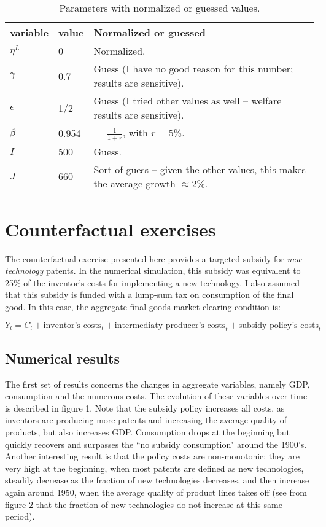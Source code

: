 \documentclass[a4paper,11pt]{article}
\begin{document}
\begin{table}[h!]
\caption{Parameters with normalized or guessed values.}
\centering
\begin{tabular}{lll}
\hline \hline
variable & value & Normalized or guessed \\ \hline
$\eta^L$ & 0 & Normalized. \\
$\gamma$ & 0.7 & Guess (I have no good reason for this number; results are sensitive). \\
$\epsilon$ & 1/2 & Guess (I tried other values as well -- welfare results are sensitive). \\
$\beta$ & 0.954 & $=\frac{1}{1+r}$, with $r = 5\%$. \\
$I$ & 500 & Guess. \\
$J$ & 660 & Sort of guess -- given the other values, this makes the average growth $\approx 2\%$. \\
\hline \hline
\end{tabular}
\end{table}


\section{Counterfactual exercises}

The counterfactual exercise presented here provides a targeted subsidy for \textit{new technology} patents. In the numerical simulation, this subsidy was equivalent to 25\% of the inventor's costs for implementing a new technology. I also assumed that this subsidy is funded with a lump-sum tax on consumption of the final good. In this case, the aggregate final goods market clearing condition is:

\[ Y_t = C_t + \mbox{inventor's costs}_t + \mbox{intermediaty producer's costs}_t + \mbox{subsidy policy's costs}_t \]

\subsection{Numerical results}

The first set of results concerns the changes in aggregate variables, namely GDP, consumption and the numerous costs. The evolution of these variables over time is described in figure 1. Note that the subsidy policy increases all costs, as inventors are producing more patents and increasing the average quality of products, but also increases GDP. Consumption drops at the beginning but quickly recovers and surpasses the ``no subsidy consumption" around the 1900's. Another interesting result is that the policy costs are non-monotonic: they are very high at the beginning, when most patents are defined as new technologies, steadily decrease as the fraction of new technologies decreases, and then increase again around 1950, when the average quality of product lines takes off (see from figure 2 that the fraction of new technologies do not increase at this same period).
\end{document}

